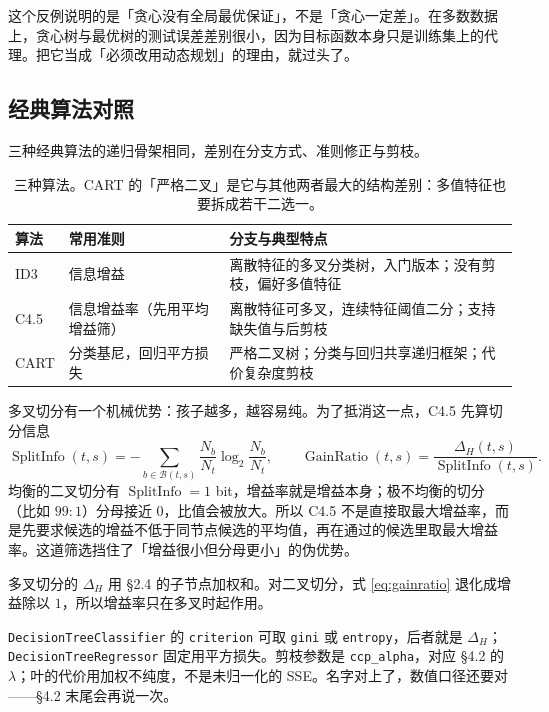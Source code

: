\documentclass[11pt,a4paper,fontset=windows,zihao=-4]{ctexart}
\DeclareMathOperator{\SplitInfo}{SplitInfo}
\DeclareMathOperator{\GainRatio}{GainRatio}
\newcommand{\Bcal}{\mathcal{B}}
\newcommand{\tabhead}{\sffamily\bfseries\color{navy}}
\begin{document}
\begin{warn}[反例的边界]
这个反例说明的是「贪心没有全局最优保证」，不是「贪心一定差」。在多数数据上，贪心树与最优树的测试误差差别很小，因为目标函数本身只是训练集上的代理。把它当成「必须改用动态规划」的理由，就过头了。
\end{warn}

\subsection{经典算法对照}

三种经典算法的递归骨架相同，差别在分支方式、准则修正与剪枝。

\begin{table}[htbp]
\centering
\small
\begin{tabular}{@{}p{1.5cm}p{4.2cm}p{7.6cm}@{}}
\toprule
\rowcolor{navy!7}
\tabhead 算法 & \tabhead 常用准则 & \tabhead 分支与典型特点\\
\midrule
ID3 & 信息增益 & 离散特征的多叉分类树，入门版本；没有剪枝，偏好多值特征\\
C4.5 & 信息增益率（先用平均增益筛） & 离散特征可多叉，连续特征阈值二分；支持缺失值与后剪枝\\
CART & 分类基尼，回归平方损失 & 严格二叉树；分类与回归共享递归框架；代价复杂度剪枝\\
\bottomrule
\end{tabular}
\caption{三种算法。CART 的「严格二叉」是它与其他两者最大的结构差别：多值特征也要拆成若干二选一。}
\label{tab:algorithms}
\end{table}

多叉切分有一个机械优势：孩子越多，越容易纯。为了抵消这一点，C4.5 先算切分信息
\begin{equation}
  \SplitInfo(t,s)
  =-\sum_{b\in\Bcal(t,s)}\frac{N_b}{N_t}\log_2\frac{N_b}{N_t},
  \qquad
  \GainRatio(t,s)=\frac{\Delta_H(t,s)}{\SplitInfo(t,s)} .
  \label{eq:gainratio}
\end{equation}
均衡的二叉切分有 $\SplitInfo=1$ bit，增益率就是增益本身；极不均衡的切分（比如 $99:1$）分母接近 $0$，比值会被放大。所以 C4.5 不是直接取最大增益率，而是先要求候选的增益不低于同节点候选的平均值，再在通过的候选里取最大增益率。这道筛选挡住了「增益很小但分母更小」的伪优势。

多叉切分的 $\Delta_H$ 用 §2.4 的子节点加权和。对二叉切分，式 \eqref{eq:gainratio} 退化成增益除以 $1$，所以增益率只在多叉时起作用。

\begin{add}[实现里的两个名字]
\texttt{DecisionTreeClassifier} 的 \texttt{criterion} 可取 \texttt{gini} 或 \texttt{entropy}，后者就是 $\Delta_H$；\texttt{DecisionTreeRegressor} 固定用平方损失。剪枝参数是 \texttt{ccp\_alpha}，对应 §4.2 的 $\lambda$；叶的代价用加权不纯度，不是未归一化的 SSE。名字对上了，数值口径还要对——§4.2 末尾会再说一次。
\end{add}
\end{document}
